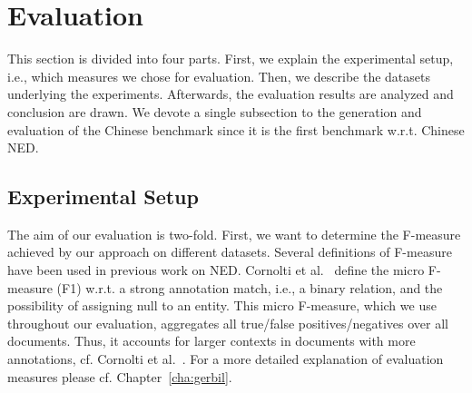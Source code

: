 

\section{Evaluation}
\label{sec:eval}

This section is divided into four parts. 
First, we explain the experimental setup, i.e., which measures we chose for evaluation.
Then, we describe the datasets underlying the experiments. 
Afterwards, the evaluation results are analyzed and conclusion are drawn. 
We devote a single subsection to the generation and evaluation of the Chinese benchmark since it is the first benchmark w.r.t. Chinese \ac{NED}.

\subsection{Experimental Setup}
\label{eval}
The aim of our evaluation is two-fold.
First, we want  to determine the F-measure achieved by our approach on different datasets.
Several definitions of F-measure have been used in previous work on \ac{NED}.
Cornolti et al.~\cite{cornolti} define the micro F-measure (F1) w.r.t. a strong annotation match, i.e., a binary relation, and the possibility of assigning null to an entity.
This micro F-measure, which we use throughout our evaluation, aggregates all true/false positives/negatives over all documents.
Thus, it accounts for larger contexts in documents with more annotations, cf. Cornolti et al.~\cite{cornolti, GERBIL}.
For a more detailed explanation of evaluation measures please cf. Chapter~\ref{cha:gerbil}.

